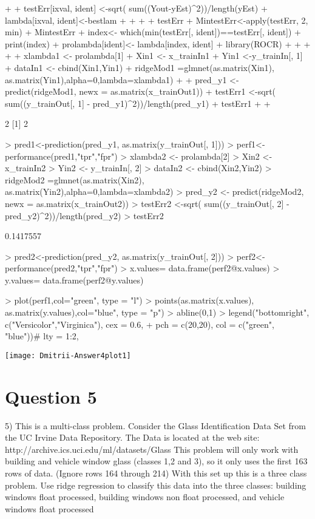 \documentclass{article}
\begin{document}
\begin{Schunk}
\begin{Sinput}
{{+     
+     testErr[ixval, ident] <-sqrt( sum((Yout-yEst)^2))/length(yEst)
+     lambda[ixval, ident]<-bestlam
+ 
+ }
+   
+   testErr
+   MintestErr<-apply(testErr, 2, min)
+   MintestErr 
+   index<- which(min(testErr[, ident])==testErr[, ident])
+   print(index)  
+   prolambda[ident]<- lambda[index, ident]
+   library(ROCR)
+ 
+ 
+ 
+ 
+ xlambda1 <- prolambda[1]
+ Xin1 <- x_trainIn1
+ Yin1 <-y_trainIn[, 1]
+ dataIn1 <- cbind(Xin1,Yin1)
+ ridgeMod1 =glmnet(as.matrix(Xin1), as.matrix(Yin1),alpha=0,lambda=xlambda1)
+ 
+ pred_y1 <- predict(ridgeMod1, newx = as.matrix(x_trainOut1))
+ testErr1 <-sqrt( sum((y_trainOut[, 1] - pred_y1)^2))/length(pred_y1)
+ testErr1
+   
+ }
\end{Sinput}
\begin{Soutput}
[1] 2
[1] 2
\end{Soutput}
\begin{Sinput}
> pred1<-prediction(pred_y1, as.matrix(y_trainOut[, 1]))
> perf1<-performance(pred1,"tpr","fpr")
> xlambda2 <- prolambda[2]
> Xin2 <- x_trainIn2
> Yin2 <- y_trainIn[, 2]
> dataIn2 <- cbind(Xin2,Yin2)
> ridgeMod2 =glmnet(as.matrix(Xin2), as.matrix(Yin2),alpha=0,lambda=xlambda2)
> pred_y2 <- predict(ridgeMod2, newx = as.matrix(x_trainOut2))
> testErr2 <-sqrt( sum((y_trainOut[, 2] -pred_y2)^2))/length(pred_y2)
> testErr2 
\end{Sinput}
\begin{Soutput}
[1] 0.1417557
\end{Soutput}
\begin{Sinput}
> pred2<-prediction(pred_y2, as.matrix(y_trainOut[, 2]))
> perf2<-performance(pred2,"tpr","fpr")
> x.values= data.frame(perf2@x.values)
> y.values= data.frame(perf2@y.values)
\end{Sinput}
\end{Schunk}
\begin{Schunk}
\begin{Sinput}
> plot(perf1,col="green", type = "l") 
> points(as.matrix(x.values), as.matrix(y.values),col="blue", type = "p") 
> abline(0,1)
> legend("bottomright", c("Versicolor","Virginica"), cex = 0.6, 
+        pch = c(20,20), col = c("green", "blue"))# lty = 1:2,
\end{Sinput}
\end{Schunk}
\texttt{[image: Dmitrii-Answer4plot1]}

\section*{Question 5}
5) This is a multi-class problem. Consider the Glass Identification Data Set
from the UC Irvine Data Repository. The Data is located at the web site:
http://archive.ics.uci.edu/ml/datasets/Glass%
This problem will only work with building and vehicle window glass (classes
1,2 and 3), so it only uses the first 163 rows of data. (Ignore rows 164
through 214) With this set up this is a three class problem. Use ridge
regression to classify this data into the three classes: building windows float
processed, building windows non float processed, and vehicle windows
float processed
\end{document}

